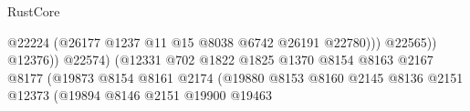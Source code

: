 \begin{lexlean}{RustCore}
\begin{coremodule}
                                                                        @22224
                                                                        (@26177
                                                                          @1237
                                                                          @11
                                                                          @15
                                                                          @8038
                                                                          @6742
                                                                          @26191
                                                                          @22780)))
                                                                    @22565))
                                                                @12376))
                                                            @22574)
                                                          (@12331
                                                            @702
                                                            @1822
                                                            @1825
                                                            @1370
                                                            @8154
                                                            @8163
                                                            @2167
                                                            @8177
                                                            (@19873
                                                              @8154
                                                              @8161
                                                              @2174
                                                              (@19880
                                                                @8153
                                                                @8160
                                                                @2145
                                                                @8136
                                                                @2151
                                                                @12373
                                                                (@19894
                                                                  @8146
                                                                  @2151
                                                                  @19900
                                                                  @19463

\end{coremodule}
\end{lexlean}
